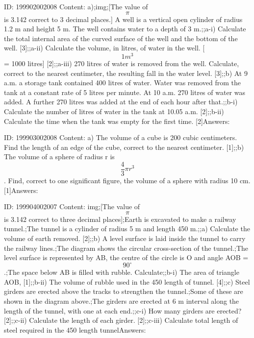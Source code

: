 \documentclass{article}
\begin{document}
ID: 199902002008
Content:
a);img;[The value of $$\pi$$ is 3.142 correct to 3 decimal places.] A well is a vertical open cylinder of radius 1.2 m and height 5 m. The well contains water to a depth of 3 m.;;a-i) Calculate the total internal area of the curved surface of the well and the bottom of the well. [3];;a-ii) Calculate the volume, in litres, of water in the well. [$$1m^{3} $$ = 1000 litres] [2];;a-iii) 270 litres of water is removed from the well. Calculate, correct to the nearest centimeter, the resulting fall in the water level. [3];;b) At 9 a.m. a storage tank contained 400 litres of water. Water was removed from the tank at a constant rate of 5 litres per minute. At 10 a.m. 270 litres of water was added. A further 270 litres was added at the end of each hour after that.;;b-i) Calculate the number of litres of water in the tank at 10.05 a.m. [2];;b-ii) Calculate the time when the tank was empty for the first time. [2]Answers:

ID: 199903002008
Content:
a) The volume of a cube is 200 cubic centimeters. Find the length of an edge of the cube, correct to the nearest centimeter. [1];;b) The volume of a sphere of radius r is $$\frac{4}{3} \pi r^3$$. Find, correct to one significant figure, the volume of a sphere with radius 10 cm. [1]Answers:

ID: 199904002007
Content:
img;[The value of $$\pi$$ is 3.142 correct to three decimal places];Earth is excavated to make a railway tunnel.;The tunnel is a cylinder of radius 5 m and length 450 m.;;a) Calculate the volume of earth removed. [2];;b) A level surface is laid inside the tunnel to carry the railway lines.;The diagram shows the circular cross-section of the tunnel.;The level surface is represented by AB, the centre of the circle is O and angle AOB = $$90^{\circ}$$.;The space below AB is filled with rubble. Calculate;;b-i) The area of triangle AOB, [1];;b-ii) The volume of rubble used in the 450 length of tunnel. [4];;c) Steel girders are erected above the tracks to strengthen the tunnel.;Some of these are shown in the diagram above.;The girders are erected at 6 m interval along the length of the tunnel, with one at each end.;;c-i) How many girders are erected? [2];;c-ii) Calculate the length of each girder. [2];;c-iii) Calculate total length of steel required in the 450 length tunnelAnswers:
\end{document}

